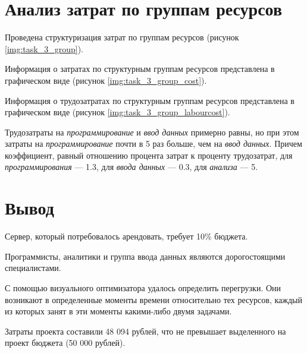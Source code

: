 \section{Анализ затрат по группам ресурсов}

Проведена структуризация затрат по группам ресурсов (рисунок \ref{img:task_3_group}).

\newpage
Информация о затратах по структурным группам ресурсов представлена в 
графическом виде (рисунок \ref{img:task_3_group_cost}).

Информация о трудозатратах по структурным группам ресурсов представлена в 
графическом виде (рисунок \ref{img:task_3_group_labourcost}).

\newpage
Трудозатраты на \textit{программирование} и \textit{ввод данных} примерно равны, но при этом затраты на \textit{программирование}
почти в 5 раз больше, чем на \textit{ввод данных}. Причем коэффициент, равный отношению процента затрат к 
проценту трудозатрат, для \textit{программирования} --- 1.3, для \textit{ввода данных} --- 0.3, для  \textit{анализа} --- 5.

\section{Вывод}

Сервер, который потребовалось арендовать, требует 10\% бюджета.

Программисты, аналитики и группа ввода данных являются дорогостоящими специалистами.

С помощью визуального оптимизатора удалось определить перегрузки. Они возникают в
определенные моменты времени относительно тех ресурсов, каждый из которых 
занят в эти моменты какими-либо двумя задачами.

Затраты проекта составили 48 094 рублей, что не превышает выделенного на проект бюджета (50 000 рублей).